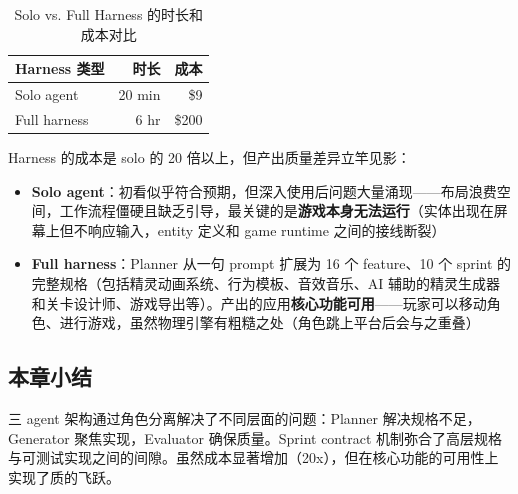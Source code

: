 \begin{table}[H]
\centering
\begin{tabular}{lrr}
\toprule
\textbf{Harness 类型} & \textbf{时长} & \textbf{成本} \\
\midrule
Solo agent & 20 min & \$9 \\
Full harness & 6 hr & \$200 \\
\bottomrule
\end{tabular}
\caption{Solo vs. Full Harness 的时长和成本对比}
\end{table}

Harness 的成本是 solo 的 20 倍以上，但产出质量差异立竿见影：

\begin{itemize}
    \item \textbf{Solo agent}：初看似乎符合预期，但深入使用后问题大量涌现——布局浪费空间，工作流程僵硬且缺乏引导，最关键的是\textbf{游戏本身无法运行}（实体出现在屏幕上但不响应输入，entity 定义和 game runtime 之间的接线断裂）
    \item \textbf{Full harness}：Planner 从一句 prompt 扩展为 16 个 feature、10 个 sprint 的完整规格（包括精灵动画系统、行为模板、音效音乐、AI 辅助的精灵生成器和关卡设计师、游戏导出等）。产出的应用\textbf{核心功能可用}——玩家可以移动角色、进行游戏，虽然物理引擎有粗糙之处（角色跳上平台后会与之重叠）
\end{itemize}

\subsection{本章小结}

三 agent 架构通过角色分离解决了不同层面的问题：Planner 解决规格不足，Generator 聚焦实现，Evaluator 确保质量。Sprint contract 机制弥合了高层规格与可测试实现之间的间隙。虽然成本显著增加（20x），但在核心功能的可用性上实现了质的飞跃。

